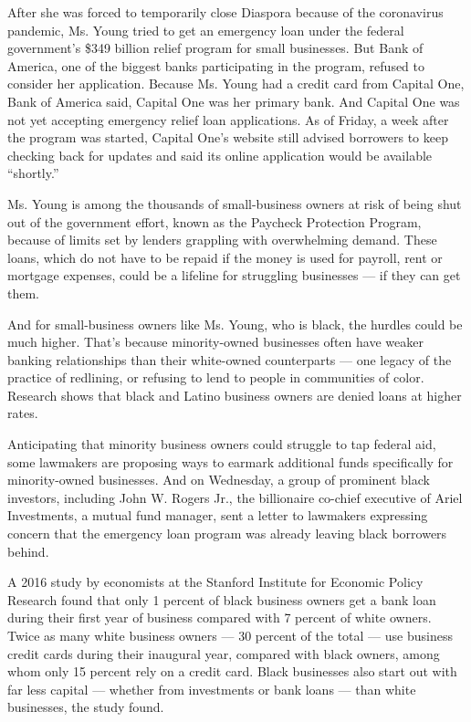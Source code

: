 After she was forced to temporarily close Diaspora because of the
coronavirus pandemic, Ms. Young tried to get an emergency loan under the
federal government's \$349 billion relief program for small businesses.
But Bank of America, one of the biggest banks participating in the
program, refused to consider her application. Because Ms. Young had a
credit card from Capital One, Bank of America said, Capital One was her
primary bank. And Capital One was not yet accepting emergency relief
loan applications. As of Friday, a week after the program was started,
Capital One's website still advised borrowers to keep checking back for
updates and said its online application would be available ``shortly.''

Ms. Young is among the thousands of small-business owners at risk of
being shut out of the government effort, known as the Paycheck
Protection Program, because of limits set by lenders grappling with
overwhelming demand. These loans, which do not have to be repaid if the
money is used for payroll, rent or mortgage expenses, could be a
lifeline for struggling businesses --- if they can get them.

And for small-business owners like Ms. Young, who is black, the hurdles
could be much higher. That's because minority-owned businesses often
have weaker banking relationships than their white-owned counterparts
--- one legacy of the practice of redlining, or refusing to lend to
people in communities of color. Research shows that black and Latino
business owners are denied loans at higher rates.

Anticipating that minority business owners could struggle to tap federal
aid, some lawmakers are proposing ways to earmark additional funds
specifically for minority-owned businesses. And on Wednesday, a group of
prominent black investors, including John W. Rogers Jr., the billionaire
co-chief executive of Ariel Investments, a mutual fund manager, sent a
letter to lawmakers expressing concern that the emergency loan program
was already leaving black borrowers behind.

A 2016 study by economists at the Stanford Institute for Economic Policy
Research found that only 1 percent of black business owners get a bank
loan during their first year of business compared with 7 percent of
white owners. Twice as many white business owners --- 30 percent of the
total --- use business credit cards during their inaugural year,
compared with black owners, among whom only 15 percent rely on a credit
card. Black businesses also start out with far less capital --- whether
from investments or bank loans --- than white businesses, the study
found.

